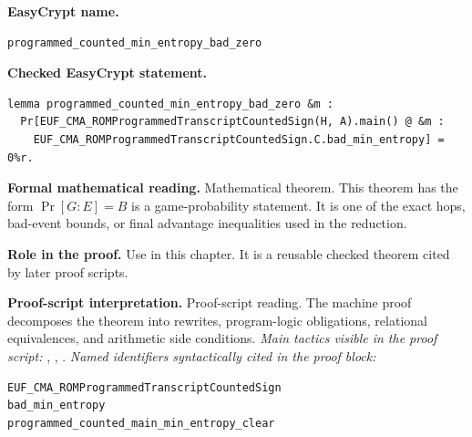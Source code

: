 \begin{formaltheorem}
\noindent\textbf{EasyCrypt name.}
\begin{lstlisting}[language=EasyCrypt,basicstyle=\ttfamily\scriptsize]
programmed_counted_min_entropy_bad_zero
\end{lstlisting}
\noindent\textbf{Checked EasyCrypt statement.}
\begin{lstlisting}[language=EasyCrypt,basicstyle=\ttfamily\scriptsize]
lemma programmed_counted_min_entropy_bad_zero &m :
  Pr[EUF_CMA_ROMProgrammedTranscriptCountedSign(H, A).main() @ &m :
    EUF_CMA_ROMProgrammedTranscriptCountedSign.C.bad_min_entropy] = 0%r.
\end{lstlisting}
\noindent\textbf{Formal mathematical reading.}
Mathematical theorem. This theorem has the form \(\Pr[G:E] = B\) is a game-probability statement.  It is one of the exact hops, bad-event bounds, or final advantage inequalities used in the reduction.

\noindent\textbf{Role in the proof.}
Use in this chapter. It is a reusable checked theorem cited by later proof scripts.

\noindent\textbf{Proof-script interpretation.}
Proof-script reading. The machine proof decomposes the theorem into rewrites, program-logic obligations, relational equivalences, and arithmetic side conditions.
\emph{Main tactics visible in the proof script:} , , .
\emph{Named identifiers syntactically cited in the proof block:}
\begin{lstlisting}[language=EasyCrypt,basicstyle=\ttfamily\scriptsize]
EUF_CMA_ROMProgrammedTranscriptCountedSign
bad_min_entropy
programmed_counted_main_min_entropy_clear
\end{lstlisting}

\end{formaltheorem}


